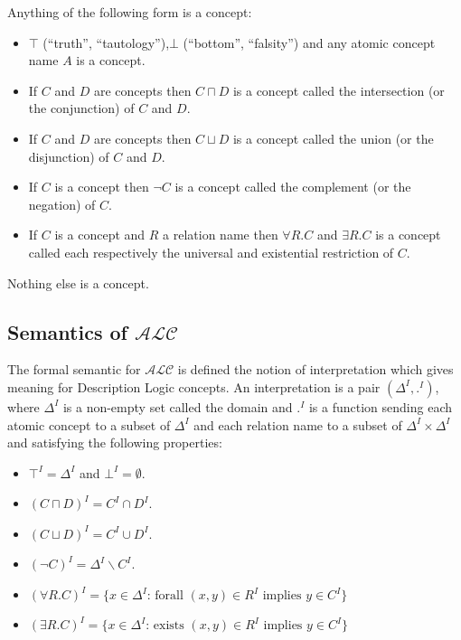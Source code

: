 Anything of the following form is a concept:
\begin{itemize}
\item $\top$ (``truth'', ``tautology''),$\bot$ (``bottom'', ``falsity'') and any atomic concept name $A$ is a concept.
\item If $C$ and $D$ are concepts then $C \sqcap D$ is a concept
  called the intersection (or the conjunction) of $C$ and $D$.
\item If $C$ and $D$ are concepts then $C \sqcup D$ is a concept
  called the union (or the disjunction) of $C$ and $D$.
\item If $C$ is a concept then $\neg C$ is a concept called the complement (or the
  negation) of $C$.
\item If $C$ is a concept and $R$ a relation name then $\forall R . C$
  and $\exists R . C$ is a concept called each respectively the
  universal and existential restriction of $C$.
\end{itemize}

Nothing else is a concept.

\subsection{Semantics of $\mathcal{ALC}$}

The formal semantic for $\mathcal{ALC}$ is defined the notion of
interpretation which gives meaning for Description Logic concepts. An
interpretation is a pair $(\Delta^{I},.^{I})$, where $\Delta^{I}$ is a
non-empty set called the domain and $.^{I}$ is a function sending each
atomic concept to a subset of $\Delta^{I}$ and each relation name to a
subset of $\Delta^{I} \times \Delta^{I}$ and satisfying the following
properties:

\begin{itemize}
\item $\top^{I} = \Delta^{I}$ and $\bot^{I} = \emptyset$.
\item $(C \sqcap D)^{I} = C^{I} \cap D^{I}$.
\item $(C \sqcup D)^{I} = C^{I} \cup D^{I}$.
\item $(\neg C)^{I} = \Delta^{I} \backslash C^{I}$.
\item $(\forall R . C)^{I} = \{x \in \Delta^{I} \text{: forall } (x,y) \in R^{I} \text{ implies } y \in C^{I}\}$ 
\item $(\exists R . C)^{I} = \{x \in \Delta^{I} \text{: exists } (x,y) \in R^{I} \text{ implies } y \in C^{I}\}$ 
\end{itemize}


